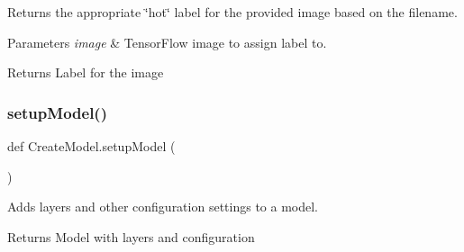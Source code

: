 Returns the appropriate \char`\"{}hot\char`\"{} label for the provided image based on the filename. 


\begin{DoxyParams}{Parameters}
{\em image} & Tensor\+Flow image to assign label to. \\
\hline
\end{DoxyParams}
\begin{DoxyReturn}{Returns}
Label for the image 
\end{DoxyReturn}
\mbox{\label{namespaceCreateModel_a4fe88b0b4e6d006ace78866bd98f8553}} 
\subsubsection{\texorpdfstring{setup\+Model()}{setupModel()}}
{\footnotesize\ttfamily def Create\+Model.\+setup\+Model (\begin{DoxyParamCaption}{ }\end{DoxyParamCaption})}



Adds layers and other configuration settings to a model. 

\begin{DoxyReturn}{Returns}
Model with layers and configuration 
\end{DoxyReturn}
